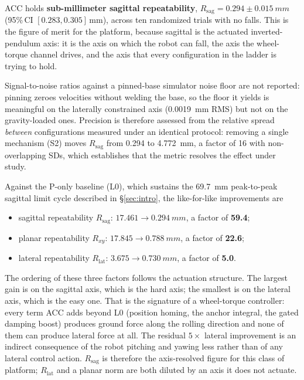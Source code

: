 \documentclass[conference]{IEEEtran}
\begin{document}
ACC holds \textbf{sub-millimeter sagittal repeatability},
$R_{\text{sag}} = 0.294{\pm}\SI{0.015}{mm}$ (95\%\,CI $[0.283,0.305]$\,mm), across
ten randomized trials with no falls. This is the figure of merit for the platform,
because sagittal is the actuated inverted-pendulum axis: it is the axis on which
the robot can fall, the axis the wheel-torque channel drives, and the axis that
every configuration in the ladder is trying to hold.

Signal-to-noise ratios against a pinned-base simulator noise floor are not
reported: pinning zeroes velocities without welding the base, so the floor it
yields is meaningful on the laterally constrained axis (\SI{0.0019}{mm} RMS) but
not on the gravity-loaded ones. Precision is therefore assessed from the relative spread
\emph{between} configurations measured under an identical protocol: removing a
single mechanism (S2) moves $R_{\text{sag}}$ from \num{0.294} to
\SI{4.772}{mm}, a factor of \num{16} with non-overlapping SDs, which
establishes that the metric resolves the effect under study.

Against the P-only baseline (L0), which sustains the \SI{69.7}{mm} peak-to-peak
sagittal limit cycle described in \S\ref{sec:intro}, the like-for-like
improvements are

\begin{itemize}
\item sagittal repeatability $R_{\text{sag}}$: $17.461 \rightarrow \SI{0.294}{mm}$, a factor of \textbf{59.4};
\item planar repeatability $R_{xy}$: $17.845 \rightarrow \SI{0.788}{mm}$, a factor of \textbf{22.6};
\item lateral repeatability $R_{\text{lat}}$: $3.675 \rightarrow \SI{0.730}{mm}$, a factor of \textbf{5.0}.
\end{itemize}

The ordering of these three factors follows the actuation structure. The largest
gain is on the sagittal axis, which is the hard axis; the smallest is on the
lateral axis, which is the easy one. That is the signature of a
wheel-torque controller: every term ACC adds beyond L0 (position homing, the anchor integral, the gated damping boost) produces ground force along the
rolling direction and none of them can produce lateral force at all. The residual
$5{\times}$ lateral improvement is an indirect consequence of the robot pitching
and yawing less rather than of any lateral control action.
$R_{\text{sag}}$ is therefore the axis-resolved figure for this class of
platform; $R_{\text{lat}}$ and a planar norm are both diluted by an axis it
does not actuate.
\end{document}
